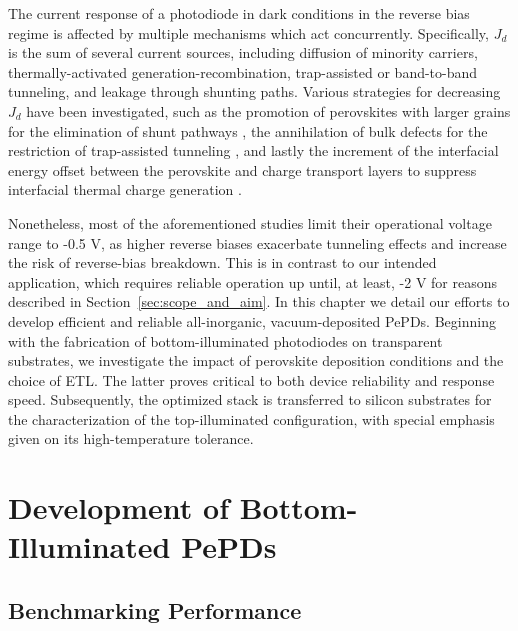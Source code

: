 The current response of a photodiode in dark conditions in the reverse bias regime is affected by multiple mechanisms which act concurrently. Specifically, $J_d$ is the sum of several current sources, including diffusion of minority carriers, thermally-activated generation-recombination, trap-assisted or band-to-band tunneling, and leakage through shunting paths. Various strategies for decreasing $J_d$ have been investigated, such as the promotion of perovskites with larger grains for the elimination of shunt pathways \cite{Jang2022PreventionPhotodetection, Yang2024High-PerformancePathways}, the annihilation of bulk defects for the restriction of trap-assisted tunneling \cite{Furlan2022TuningDetectivity, Yao2019High-Rubidium-Formamidinium-RatioStability, Li2020Self-poweredStability}, and lastly the increment of the interfacial energy offset between the perovskite and charge transport layers to suppress interfacial thermal charge generation \cite{Ollearo2021UltralowGeneration, Martinez-Goyeneche2024Vacuum-DepositedDetection, Ollearo2022MultidimensionalPhotodiodes}. 

Nonetheless, most of the aforementioned studies limit their operational voltage range to -0.5 V, as higher reverse biases exacerbate tunneling effects and increase the risk of reverse-bias breakdown. This is in contrast to our intended application, which requires reliable operation up until, at least, -2 V for reasons described in Section~\ref{sec:scope_and_aim}. In this chapter we detail our efforts to develop efficient and reliable all-inorganic, vacuum-deposited PePDs. Beginning with the fabrication of bottom-illuminated photodiodes on transparent substrates, we investigate the impact of perovskite deposition conditions and the choice of ETL. The latter proves critical to both device reliability and response speed. Subsequently, the optimized stack is transferred to silicon substrates for the characterization of the top-illuminated configuration, with special emphasis given on its high-temperature tolerance.


\section{Development of Bottom-Illuminated PePDs}

\subsection{Benchmarking Performance}

